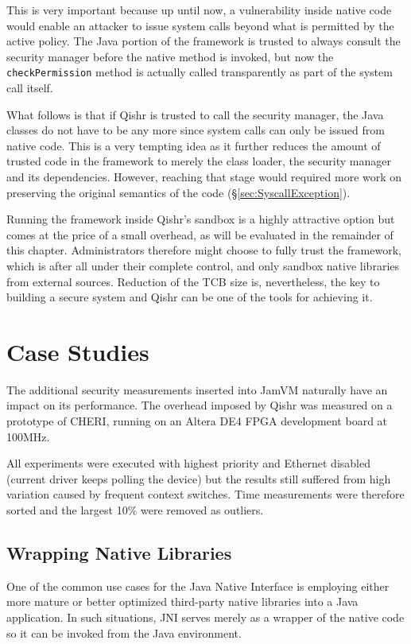 \documentclass[a4paper,12pt,twoside,openright]{report}
\begin{document}
This is very important because up until now, a vulnerability inside native code would enable an attacker to issue system calls beyond what is permitted by the active policy. The Java portion of the framework is trusted to always consult the security manager before the native method is invoked, but now the \texttt{checkPermission} method is actually called transparently as part of the system call itself. 

What follows is that if Qishr is trusted to call the security manager, the Java classes do not have to be any more since system calls can only be issued from native code. This is a very tempting idea as it further reduces the amount of trusted code in the framework to merely the class loader, the security manager and its dependencies. However, reaching that stage would required more work on preserving the original semantics of the code (\S\ref{sec:SyscallException}).

Running the framework inside Qishr's sandbox is a highly attractive option but comes at the price of a small overhead, as will be evaluated in the remainder of this chapter. Administrators therefore might choose to fully trust the framework, which is after all under their complete control, and only sandbox native libraries from external sources. Reduction of the TCB size is, nevertheless, the key to building a secure system and Qishr can be one of the tools for achieving it.

\section{Case Studies}

The additional security measurements inserted into JamVM naturally have an impact on its performance. The overhead imposed by Qishr was measured on a prototype of CHERI, running on an Altera DE4 FPGA development board at 100MHz. 

All experiments were executed with highest priority and Ethernet disabled (current driver keeps polling the device) but the results still suffered from high variation caused by frequent context switches. Time measurements were therefore sorted and the largest 10\% were removed as outliers. 

\subsection{Wrapping Native Libraries}

One of the common use cases for the Java Native Interface is employing either more mature or better optimized third-party native libraries into a Java application. In such situations, JNI serves merely as a wrapper of the native code so it can be invoked from the Java environment.
\end{document}
